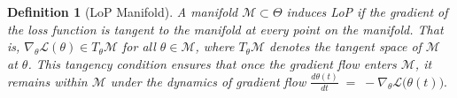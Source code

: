 \documentclass{article}
\newcommand{\Loss}{\mathcal{L}}
\newtheorem{definition}{Definition}[section]
\numberwithin{figure}{section}
\begin{document}
\begin{definition}[LoP Manifold]
\label{def:lop}
A manifold $\mathcal{M}\subset\Theta$ induces LoP if the gradient of the loss function is tangent to the manifold at every point on the manifold. That is, $\nabla_\theta\Loss(\theta)\in T_\theta\mathcal{M}$ for all $\theta\in\mathcal{M}$, where $T_\theta\mathcal{M}$ denotes the tangent space of $\mathcal{M}$ at $\theta$. This tangency condition ensures that once the gradient flow enters $\mathcal{M}$, it remains within $\mathcal{M}$ under the dynamics of gradient flow $\frac{d\theta(t)}{dt} \;=\; -\nabla_\theta\Loss\bigl(\theta(t)\bigr).$
\end{definition}
\end{document}
